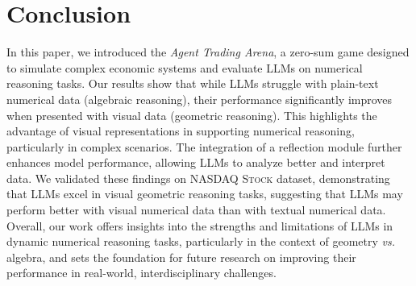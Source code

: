 \section{Conclusion}



In this paper, we introduced the \textit{Agent Trading Arena}, a zero-sum game designed to simulate complex economic systems and evaluate LLMs on numerical reasoning tasks. Our results show that while LLMs struggle with plain-text numerical data (algebraic reasoning), their performance significantly improves when presented with visual data (geometric reasoning). This highlights the advantage of visual representations in supporting numerical reasoning, particularly in complex scenarios. 
The integration of a reflection module further enhances model performance, allowing LLMs to analyze better and interpret data. We validated these findings on \textsc{NASDAQ Stock} dataset, demonstrating that LLMs excel in visual geometric reasoning tasks, suggesting that LLMs may perform better with visual numerical data than with textual numerical data. 
Overall, our work offers insights into the strengths and limitations of LLMs in dynamic numerical reasoning tasks, particularly in the context of geometry \textit{vs.} algebra, and sets the foundation for future research on improving their performance in real-world, interdisciplinary challenges.

